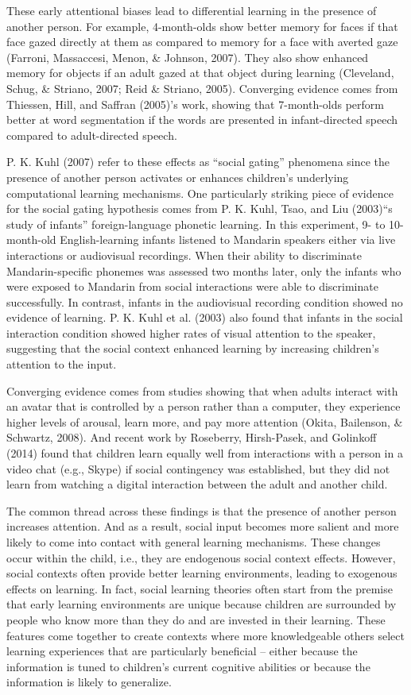 \documentclass[english,floatsintext,man]{apa6}
\theoremstyle{definition}
\theoremstyle{definition}
\theoremstyle{definition}
\theoremstyle{remark}
\begin{document}
These early attentional biases lead to differential learning in the
presence of another person. For example, 4-month-olds show better memory
for faces if that face gazed directly at them as compared to memory for
a face with averted gaze (Farroni, Massaccesi, Menon, \& Johnson, 2007).
They also show enhanced memory for objects if an adult gazed at that
object during learning (Cleveland, Schug, \& Striano, 2007; Reid \&
Striano, 2005). Converging evidence comes from Thiessen, Hill, and
Saffran (2005)'s work, showing that 7-month-olds perform better at word
segmentation if the words are presented in infant-directed speech
compared to adult-directed speech.

P. K. Kuhl (2007) refer to these effects as \enquote{social gating}
phenomena since the presence of another person activates or enhances
children's underlying computational learning mechanisms. One
particularly striking piece of evidence for the social gating hypothesis
comes from P. K. Kuhl, Tsao, and Liu (2003)\enquote{s study of infants}
foreign-language phonetic learning. In this experiment, 9- to
10-month-old English-learning infants listened to Mandarin speakers
either via live interactions or audiovisual recordings. When their
ability to discriminate Mandarin-specific phonemes was assessed two
months later, only the infants who were exposed to Mandarin from social
interactions were able to discriminate successfully. In contrast,
infants in the audiovisual recording condition showed no evidence of
learning. P. K. Kuhl et al. (2003) also found that infants in the social
interaction condition showed higher rates of visual attention to the
speaker, suggesting that the social context enhanced learning by
increasing children's attention to the input.

Converging evidence comes from studies showing that when adults interact
with an avatar that is controlled by a person rather than a computer,
they experience higher levels of arousal, learn more, and pay more
attention (Okita, Bailenson, \& Schwartz, 2008). And recent work by
Roseberry, Hirsh-Pasek, and Golinkoff (2014) found that children learn
equally well from interactions with a person in a video chat (e.g.,
Skype) if social contingency was established, but they did not learn
from watching a digital interaction between the adult and another child.

The common thread across these findings is that the presence of another
person increases attention. And as a result, social input becomes more
salient and more likely to come into contact with general learning
mechanisms. These changes occur within the child, i.e., they are
endogenous social context effects. However, social contexts often
provide better learning environments, leading to exogenous effects on
learning. In fact, social learning theories often start from the premise
that early learning environments are unique because children are
surrounded by people who know more than they do and are invested in
their learning. These features come together to create contexts where
more knowledgeable others select learning experiences that are
particularly beneficial -- either because the information is tuned to
children's current cognitive abilities or because the information is
likely to generalize.
\end{document}
